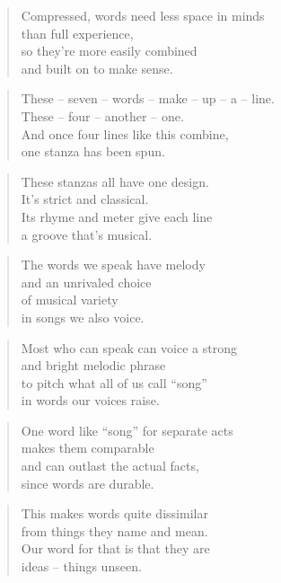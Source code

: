 \documentclass[10pt,a4paper]{article}
\begin{document}
\begin{paracol}{2}
\begin{verse}
Compressed, words need less space in minds\\
than full experience,\\
so they’re more easily combined\\
and built on to make sense.
\end{verse}

\begin{verse}
These – seven – words – make – up – a – line.\\
These – four – another – one.\\
And once four lines like this combine,\\
one stanza has been spun.
\end{verse}

\begin{verse}
These stanzas all have one design.\\
It’s strict and classical.\\
Its rhyme and meter give each line\\
a groove that’s musical.
\end{verse}

\begin{verse}
The words we speak have melody\\
and an unrivaled choice\\
of musical variety\\
in songs we also voice.
\end{verse}

\begin{verse}
Most who can speak can voice a strong\\
and bright melodic phrase\\
to pitch what all of us call “song”\\
in words our voices raise.
\end{verse}

\begin{verse}
One word like “song” for separate acts\\
makes them comparable\\
and can outlast the actual facts,\\
since words are durable.
\end{verse}

\begin{verse}
This makes words quite dissimilar\\
from things they name and mean.\\
Our word for that is that they are\\
ideas – things unseen.
\end{verse}


\end{paracol}
\end{document}

